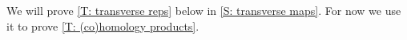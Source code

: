 We will prove \cref{T: transverse reps} below in \cref{S: transverse maps}.
For now we use it to prove \cref{T: (co)homology products}.



\begin{comment}
Suppose V is a cycle transverse to N that bounds. Then there is a Z transverse to N that realizes it:

Choose Y so that \bd Y \sqcup  -V \in Q. Y may not be transverse.

Do a universal homotopy on Y \sqcup V so that Y becomes transverse and the trace of V is transverse. Let Y’ and V’ be the results and let W be the trace of the V homotopy. Let Z = Y’ \sqcup -W, which is transverse. Also \bd Y’ \sqcup -V’ is in Q.

Then \bd Z \sqcup -V is
(\bd Y’ \sqcup - V’ \sqcup V \sqcup -V)
Which is in Q.

\end{comment}



